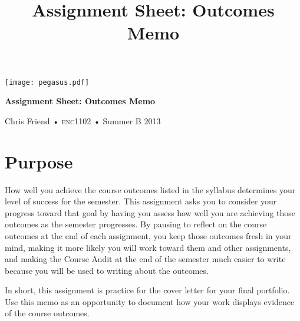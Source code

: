 \documentclass[11pt, oneside]{amsart}	%
\title[Outcomes Memo]{Assignment Sheet: Outcomes Memo}
\begin{document}
%
\thispagestyle{empty}

\begin{center}
\huge
{\texttt{[image: pegasus.pdf]}}

\textbf{Assignment Sheet: Outcomes Memo}

{\normalsize Chris Friend • \textsc{enc1102} • Summer B 2013}
\end{center}
\vspace{\baselineskip}

\section{Purpose} %
\label{sec:purpose}
How well you achieve the course outcomes listed in the syllabus determines your level of success for the semester. This assignment asks you to consider your progress toward that goal by having you assess how well you are achieving those outcomes as the semester progresses. By pausing to reflect on the course outcomes at the end of each assignment, you keep those outcomes fresh in your mind, making it more likely you will work toward them and other assignments, and making the Course Audit at the end of the semester much easier to write because you will be used to writing about the outcomes.

In short, this assignment is practice for the cover letter for your final portfolio. Use this memo as an opportunity to document how your work displays evidence of the course outcomes.
\end{document}
